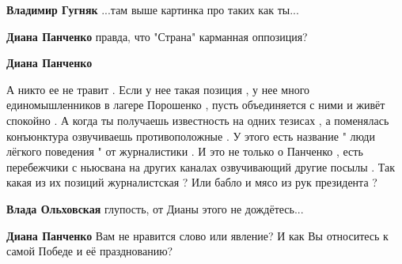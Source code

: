 \begin{itemize}
\begin{itemize}
\textbf{Владимир Гугняк} ...там выше картинка про таких как ты...

 
\textbf{Диана Панченко} правда, что "Страна" карманная оппозиция?

 
\textbf{Диана Панченко} 

А никто ее не травит . Если у нее такая позиция , у нее много единомышленников
в лагере Порошенко , пусть объединяется с ними и живёт спокойно . А когда ты
получаешь известность на одних тезисах , а поменялась конъюнктура озвучиваешь
противоположные . У этого есть название " люди лёгкого поведения " от
журналистики . И это не только о Панченко , есть перебежчики с ньюсвана на
других каналах озвучивающий другие посылы . Так какая из их позиций
журналистская ? Или бабло и мясо из рук президента ?

 
\textbf{Влада Ольховская} глупость, от Дианы этого не дождётесь...

 
\textbf{Диана Панченко} Вам не нравится слово или явление? И как Вы относитесь к самой Победе и её празднованию?

 

\end{itemize}
\end{itemize}
